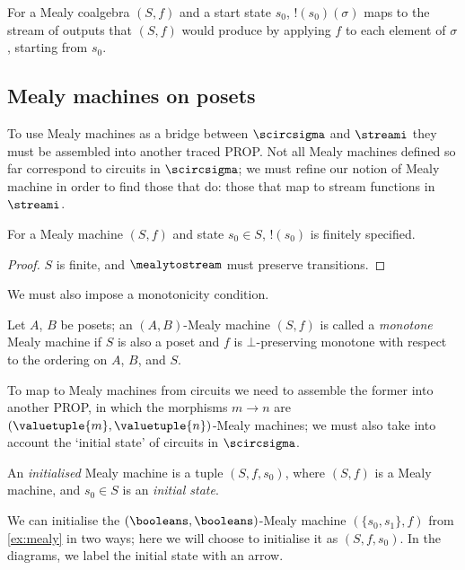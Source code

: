 For a Mealy coalgebra \((S, f)\) and a start state \(s_0\),
\(!(s_0)(\sigma)\) maps to the stream of outputs that \((S, f)\) would produce
by applying \(f\) to each element of \(\sigma\), starting from \(s_0\).

\subsection{Mealy machines on posets}

To use Mealy machines as a bridge between \(\scircsigma\) and \(\streami\) they
must be assembled into another traced PROP.
Not all Mealy machines defined so far correspond to circuits in
\(\scircsigma\); we must refine our notion of Mealy machine in order to find
those that do: those that map to stream functions in \(\streami\).

\begin{lemma}
    For a Mealy machine \((S, f)\) and state \(s_0 \in S\), \(!(s_0)\)
    is finitely specified.
\end{lemma}
\begin{proof}
    \(S\) is finite, and \(\mealytostream\) must preserve transitions.
\end{proof}

We must also impose a monotonicity condition.

\begin{definition}
    Let \(A\), \(B\) be posets; an \((A,B)\)-Mealy machine \((S, f)\)
    is called a \emph{monotone} Mealy machine if \(S\) is also a poset and
    \(f\) is \(\bot\)-preserving monotone with respect to the ordering on
    \(A\), \(B\), and \(S\).
\end{definition}

To map to Mealy machines from circuits we need to assemble the former into
another PROP, in which the morphisms \(m \to n\) are
\((\valuetuple{m},\valuetuple{n})\)-Mealy machines; we must also take into
account the `initial state' of circuits in \(\scircsigma\).

\begin{definition}
    An \emph{initialised} Mealy machine is a tuple \((S, f, s_0)\), where
    \((S, f)\) is a Mealy machine, and \(s_0 \in S\) is an \emph{initial state}.
\end{definition}

\begin{example}\label{ex:mealy-init}
    We can initialise the \((\booleans,\booleans)\)-Mealy machine
    \((\{s_0,s_1\},f)\) from \cref{ex:mealy} in two ways; here we will choose to
    initialise it as \((S,f,s_0)\).
    In the diagrams, we label the initial state with an arrow.
    \begin{center}
        
    \end{center}
\end{example}

